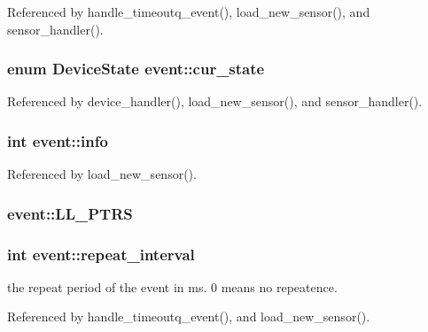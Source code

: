 Referenced by handle\-\_\-timeoutq\-\_\-event(), load\-\_\-new\-\_\-sensor(), and sensor\-\_\-handler().

\hypertarget{structevent_ad434572c03708c933947eb50f4bb5403}{
\subsubsection[{cur\-\_\-state}]{\setlength{\rightskip}{0pt plus 5cm}enum {\bf Device\-State} event\-::cur\-\_\-state}}\label{structevent_ad434572c03708c933947eb50f4bb5403}


Referenced by device\-\_\-handler(), load\-\_\-new\-\_\-sensor(), and sensor\-\_\-handler().

\hypertarget{structevent_aa6d0cb63c9eb781957c1db988d71d12f}{
\subsubsection[{info}]{\setlength{\rightskip}{0pt plus 5cm}int event\-::info}}\label{structevent_aa6d0cb63c9eb781957c1db988d71d12f}


Referenced by load\-\_\-new\-\_\-sensor().

\hypertarget{structevent_a994b32d8396bd5e998df0956908ec79d}{
\subsubsection[{L\-L\-\_\-\-P\-T\-R\-S}]{\setlength{\rightskip}{0pt plus 5cm}event\-::\-L\-L\-\_\-\-P\-T\-R\-S}}\label{structevent_a994b32d8396bd5e998df0956908ec79d}
\hypertarget{structevent_a2792fb8dafb449872de1213c65c89474}{
\subsubsection[{repeat\-\_\-interval}]{\setlength{\rightskip}{0pt plus 5cm}int event\-::repeat\-\_\-interval}}\label{structevent_a2792fb8dafb449872de1213c65c89474}


the repeat period of the event in ms. 0 means no repeatence. 



Referenced by handle\-\_\-timeoutq\-\_\-event(), and load\-\_\-new\-\_\-sensor().

